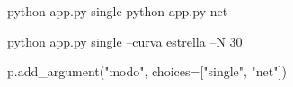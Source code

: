 python app.py single
python app.py net

python app.py single --curva estrella --N 30

p.add_argument("modo", choices=["single", "net"])